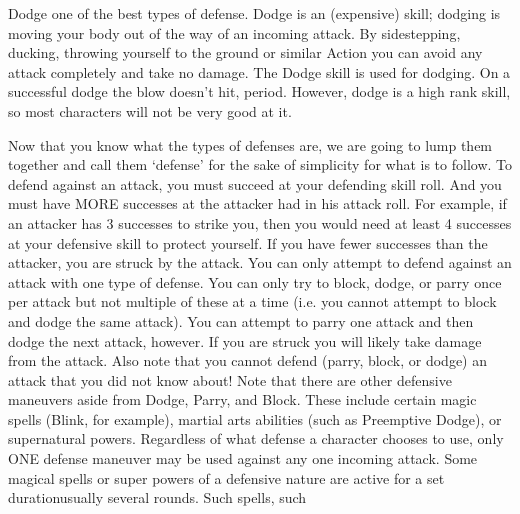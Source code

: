\documentclass[twoside]{book}
\begin{document}
                
                
                 Dodge   
                   one of the best types of defense. Dodge is an
                   (expensive) skill; dodging is moving your body out of
                   the way of an incoming attack. By sidestepping,
                   ducking, throwing yourself to the ground or similar
                   Action you can avoid any attack completely and take no
                   damage. The Dodge skill is used for dodging. On a
                   successful dodge the blow doesn't hit, period.
                   However, dodge is a high rank skill, so most
                   characters will not be very good at it. 
                
             Now that you know what the types of defenses are, we
               are going to lump them together and call them
               `defense' for the sake of simplicity for what
               is to follow.  To defend against an attack, you must succeed at
               your defending skill roll. And you must have MORE
               successes at the attacker had in his attack roll. For
               example, if an attacker has 3 successes to strike you,
               then you would need at least 4 successes at your defensive
               skill to protect yourself. If you have fewer successes
               than the attacker, you are struck by the attack. You can
               only attempt to defend against an attack with one type of
               defense. You can only try to block, dodge, or parry once
               per attack but not multiple of these at a time (i.e. you
               cannot attempt to block and dodge the same attack). You
               can attempt to parry one attack and then dodge the next
               attack, however.  If you are struck you will likely take damage from
               the attack. Also note that you cannot defend (parry,
               block, or dodge) an attack that you did not know about!
                Note that there are other defensive maneuvers
              aside from Dodge, Parry, and Block. These include
              certain magic spells (Blink, for example), martial arts
              abilities (such as Preemptive Dodge), or supernatural
              powers. Regardless of what defense a character chooses
              to use, only ONE defense maneuver may be used against
              any one incoming attack. Some magical spells or
              super powers of a defensive nature are active for a set
              durationusually several rounds. Such spells, such
\end{document}
